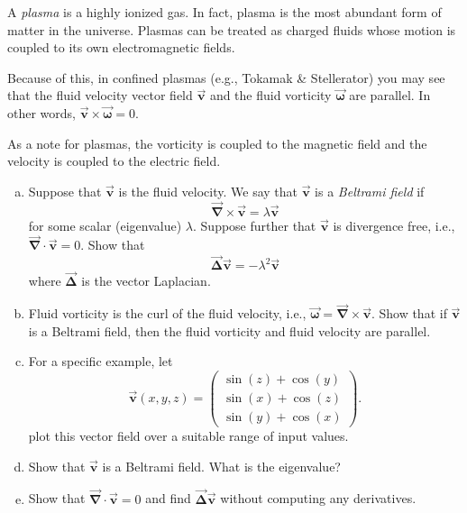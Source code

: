 \documentclass[12pt]{amsbook}
\newcommand{\grad}{\boldsymbol{\vec{\nabla}}}
\newcommand{\vf}[1]{\boldsymbol{\vec{#1}}}
\begin{document}
\begin{problem} A \emph{plasma} is a highly ionized gas. In fact, plasma is the most abundant form of matter in the universe. Plasmas can be treated as charged fluids whose motion is coupled to its own electromagnetic fields.

Because of this, in confined plasmas (e.g., Tokamak \& Stellerator) you may see that the fluid velocity vector field $\vf{v}$ and the fluid vorticity $\vf{\omega}$ are parallel. In other words, $\vf{v}\times \vf{\omega}=0$. 

As a note for plasmas, the vorticity is coupled to the magnetic field and the velocity is coupled to the electric field.

\begin{enumerate}[(a)]
\item Suppose that $\vf{v}$ is the fluid velocity. We say that $\vf{v}$ is a \emph{Beltrami field} if 
\[
\grad \times \vf{v} = \lambda \vf{v}
\]
for some scalar (eigenvalue) $\lambda$. Suppose further that $\vf{v}$ is divergence free, i.e., $\grad \cdot \vf{v}=0$. Show that
\[
\vf{\Delta} \vf{v} = -\lambda^2 \vf{v}
\]
where $\vf{\Delta}$ is the vector Laplacian.
\item Fluid vorticity is the curl of the fluid velocity, i.e., $\vf{\omega} = \grad \times \vf{v}$. Show that if $\vf{v}$ is a Beltrami field, then the fluid vorticity and fluid velocity are parallel.
\item For a specific example, let
\[
\vf{v}(x,y,z) = \begin{pmatrix} \sin(z)+\cos(y) \\ \sin(x)+\cos(z) \\ \sin(y)+\cos(x) \end{pmatrix}.
\]
plot this vector field over a suitable range of input values. 
\item Show that $\vf{v}$ is a Beltrami field. What is the eigenvalue?
\item Show that $\grad \cdot \vf{v}=0$ and find $\vf{\Delta}\vf{v}$ without computing any derivatives.
\end{enumerate}
\end{problem}
\end{document}
